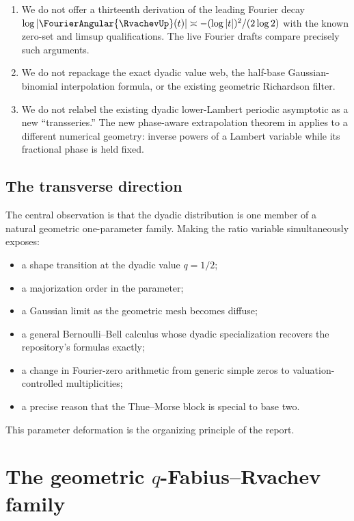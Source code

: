 \documentclass[11pt]{article}
\numberwithin{equation}{section}
\theoremstyle{definition}
\theoremstyle{remark}
\begin{document}
\begin{enumerate}
\item We do not offer a thirteenth derivation of the leading Fourier decay
\(
 \log|\FourierAngular{\RvachevUp}(t)|\asymp-(\log|t|)^2/(2\log2)
\)
with the known zero-set and limsup qualifications.  The live Fourier drafts compare precisely
such arguments.
\item We do not repackage the exact dyadic value web, the half-base Gaussian-binomial
interpolation formula, or the existing geometric Richardson filter.
\item We do not relabel the existing dyadic lower-Lambert periodic asymptotic as a new
``transseries.''  The new phase-aware extrapolation theorem in  applies to a
different numerical geometry: inverse powers of a Lambert variable while its fractional
phase is held fixed.
\end{enumerate}

\subsection{The transverse direction}

The central observation is that the dyadic distribution is one member of a natural geometric
one-parameter family.  Making the ratio variable simultaneously exposes:
\begin{itemize}
\item a shape transition at the dyadic value $q=1/2$;
\item a majorization order in the parameter;
\item a Gaussian limit as the geometric mesh becomes diffuse;
\item a general Bernoulli--Bell calculus whose dyadic specialization recovers the repository's
      formulas exactly;
\item a change in Fourier-zero arithmetic from generic simple zeros to valuation-controlled
      multiplicities;
\item a precise reason that the Thue--Morse block is special to base two.
\end{itemize}
This parameter deformation is the organizing principle of the report.

\section{The geometric \texorpdfstring{$q$}{q}-Fabius--Rvachev family}
\label{p10:sec:family}
\end{document}
